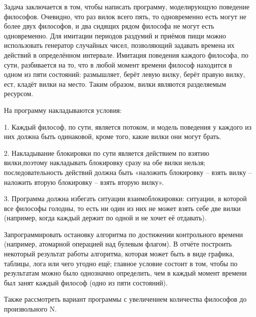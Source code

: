 \documentclass[a4paper, 14pt]{extarticle}
\begin{document}
    
    Задача заключается в том, чтобы написать программу, моделирующую поведение философов. Очевидно, что раз вилок всего пять, то одновременно есть могут не более двух философов, и два сидящих рядом философа не могут есть одновременно. Для имитации периодов раздумий и приёмов пищи можно использовать генератор случайных чисел, позволяющий задавать времена их действий в определённом интервале. Имитация поведения каждого философа, по сути, разбивается на то, что в любой момент времени философ находится в одном из пяти состояний: размышляет, берёт левую вилку, берёт правую вилку, ест, кладёт вилки на место. Таким образом, вилки являются разделяемым ресурсом.
    
    
    На программу накладываются условия:

    
    1. Каждый философ, по сути, является потоком, и модель поведения у каждого из них должна быть одинаковой, кроме того, какие вилки они могут брать.
    
    
    2. Накладывание блокировки по сути является действием по взятию вилки,поэтому накладывать блокировку сразу на обе вилки нельзя; последовательность действий должна быть «наложить блокировку – взять вилку – наложить вторую блокировку – взять вторую вилку».
    
    
    3. Программа должна избегать ситуации взаимоблокировки: ситуации, в которой все философы голодны, то есть ни один из них не может взять себе две вилки (например, когда каждый держит по одной и не хочет её отдавать).
    
    
    
    Запрограммировать остановку алгоритма по достижении контрольного времени (например, атомарной операцией над булевым флагом). В отчёте построить некоторый результат работы алгоритма, которая может быть в виде графика, таблицы, лога или чего угодно ещё; главное условие состоит в том, чтобы по результатам можно было однозначно определить, чем в каждый момент времени был занят каждый философ (одно из пяти состояний).
    
    
    
    Также рассмотреть вариант программы с увеличением количества философов до произвольного N.
\end{document}
